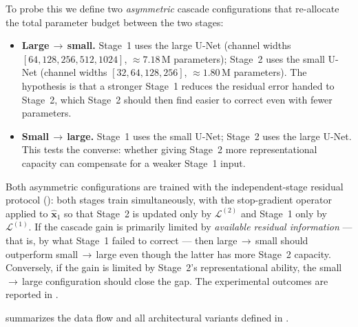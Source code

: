 To probe this we define two \emph{asymmetric} cascade configurations that re-allocate the total
parameter budget between the two stages:
\begin{itemize}
    \item \textbf{Large\,$\to$\,small.} Stage~1 uses the large U-Net (channel widths
        $[64,128,256,512,1024]$, ${\approx}7.18$\,M parameters); Stage~2 uses the small U-Net
        (channel widths $[32,64,128,256]$, ${\approx}1.80$\,M parameters). The hypothesis is
        that a stronger Stage~1 reduces the residual error handed to Stage~2, which Stage~2
        should then find easier to correct even with fewer parameters.
    \item \textbf{Small\,$\to$\,large.} Stage~1 uses the small U-Net; Stage~2 uses the large
        U-Net. This tests the converse: whether giving Stage~2 more representational capacity
        can compensate for a weaker Stage~1 input.
\end{itemize}
Both asymmetric configurations are trained with the independent-stage residual protocol
(): both stages train simultaneously, with the stop-gradient
operator applied to $\hat{\mathbf{x}}_{1}$ so that Stage~2 is updated only by
$\mathcal{L}^{(2)}$ and Stage~1 only by $\mathcal{L}^{(1)}$. If the cascade gain is primarily
limited by \emph{available residual information} --- that is, by what Stage~1 failed to correct
--- then large\,$\to$\,small should outperform small\,$\to$\,large even though the latter has
more Stage~2 capacity. Conversely, if the gain is limited by Stage~2's representational ability,
the small\,$\to$\,large configuration should close the gap. The experimental outcomes are reported
in .

 summarizes the data flow and all architectural variants
defined in .

